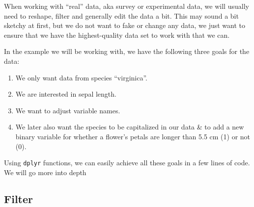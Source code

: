 \documentclass[
]{book}
\newenvironment{Shaded}{\begin{snugshade}}{\end{snugshade}}
\newcommand{\AttributeTok}[1]{\textcolor[rgb]{0.13,0.29,0.53}{#1}}
\newcommand{\CommentTok}[1]{\textcolor[rgb]{0.56,0.35,0.01}{\textit{#1}}}
\newcommand{\FunctionTok}[1]{\textcolor[rgb]{0.13,0.29,0.53}{\textbf{#1}}}
\newcommand{\NormalTok}[1]{#1}
\newcommand{\OtherTok}[1]{\textcolor[rgb]{0.56,0.35,0.01}{#1}}
\newcommand{\SpecialCharTok}[1]{\textcolor[rgb]{0.81,0.36,0.00}{\textbf{#1}}}
\newcommand{\StringTok}[1]{\textcolor[rgb]{0.31,0.60,0.02}{#1}}
\providecommand{\tightlist}{%
  \setlength{\itemsep}{0pt}\setlength{\parskip}{0pt}}
\begin{document}
When working with ``real'' data, aka survey or experimental data, we will usually need to reshape, filter and generally edit the data a bit.
This may sound a bit sketchy at first, but we do not want to fake or change any data, we just want to ensure that we have the highest-quality data set to work with that we can.

In the example we will be working with, we have the following three goals for the data:

\begin{enumerate}
\def\labelenumi{\arabic{enumi}.}
\tightlist
\item
  We only want data from species ``virginica''.
\item
  We are interested in sepal length.
\item
  We want to adjust variable names.
\item
  We later also want the species to be capitalized in our data \& to add a new binary variable for whether a flower's petals are longer than 5.5 cm (1) or not (0).
\end{enumerate}

Using \texttt{dplyr} functions, we can easily achieve all these goals in a few lines of code.
We will go more into depth

\begin{Shaded}
\end{Shaded}

\subsection{Filter}\label{filter}
\end{document}
